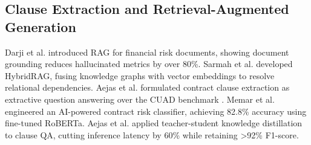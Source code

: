 \documentclass[conference]{IEEEtran}
\begin{document}
\subsection{Clause Extraction and Retrieval-Augmented Generation}
Darji et al. \cite{b11} introduced RAG for financial risk documents, showing document grounding reduces hallucinated metrics by over 80\%. Sarmah et al. \cite{b12} developed HybridRAG, fusing knowledge graphs with vector embeddings to resolve relational dependencies. Aejas et al. \cite{b13} formulated contract clause extraction as extractive question answering over the CUAD benchmark \cite{b20}. Memar et al. \cite{b14} engineered an AI-powered contract risk classifier, achieving 82.8\% accuracy using fine-tuned RoBERTa. Aejas et al. \cite{b15} applied teacher-student knowledge distillation to clause QA, cutting inference latency by 60\% while retaining >92\% F1-score.
\end{document}
